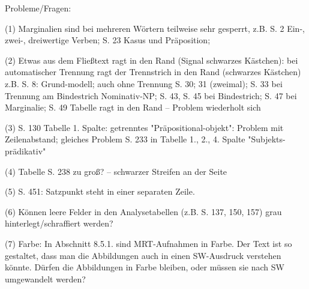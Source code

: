 Probleme/Fragen:

(1) Marginalien sind bei mehreren Wörtern teilweise sehr gesperrt, z.B. S. 2 Ein-, zwei-, dreiwertige Verben; S. 23 Kasus und Präposition; 

(2) Etwas aus dem Fließtext ragt in den Rand (Signal schwarzes Kästchen): bei automatischer Trennung ragt der Trennstrich in den Rand (schwarzes Kästchen) z.B. S. 8: Grund-modell; auch ohne Trennung S. 30; 31 (zweimal); S. 33 bei Trennung am Bindestrich Nominativ-NP; S. 43, S. 45 bei Bindestrich; S. 47 bei Marginalie; S. 49 Tabelle ragt in den Rand – Problem wiederholt sich 

(3) S. 130 Tabelle 1. Spalte: getrenntes "Präpositional-objekt": Problem mit Zeilenabstand; gleiches Problem S. 233 in Tabelle 1., 2., 4. Spalte "Subjekts-prädikativ"

(4) Tabelle S. 238 zu groß? – schwarzer Streifen an der Seite 
 
(5) S. 451: Satzpunkt steht in einer separaten Zeile.

(6) Können leere Felder in den Analysetabellen (z.B. S. 137, 150, 157) grau hinterlegt/schraffiert werden? 

(7) Farbe: In Abschnitt 8.5.1. sind MRT-Aufnahmen in Farbe. Der Text ist so gestaltet, dass man die Abbildungen auch in einen SW-Ausdruck verstehen könnte. Dürfen die Abbildungen in Farbe bleiben, oder müssen sie nach SW umgewandelt werden? 


